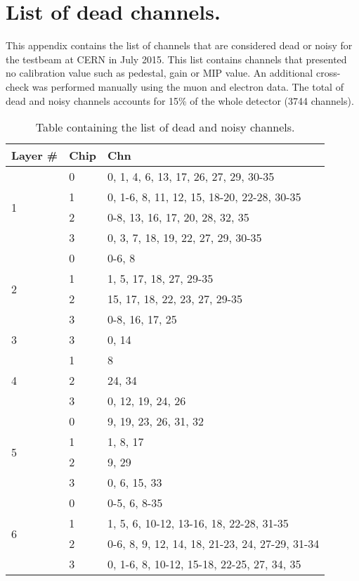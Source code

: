\chapter{List of dead channels.}
\label{appendix:deadChn}

This appendix contains the list of channels that are considered dead or noisy for the testbeam at CERN in July 2015. This list contains channels that presented no calibration value such as pedestal, gain or MIP value. An additional cross-check was performed manually \cite{AmbraEnergy} using the muon and electron data. The total of dead and noisy channels accounts for 15\% of the whole detector (3744 channels).

\begin{table}[htb!]
  \centering
  \caption{Table containing the list of dead and noisy channels.}
  \label{table:DeadNoisyList}
  \begin{tabular}{@{} lll @{}}
    \toprule
    Layer \# & Chip & Chn\\
    \midrule
    \multirow{4}{*}{1} & 0 & 0, 1, 4, 6, 13, 17, 26, 27, 29, 30-35\\
    & 1 & 0, 1-6, 8, 11, 12, 15, 18-20, 22-28, 30-35\\
    & 2 & 0-8, 13, 16, 17, 20, 28, 32, 35\\
    & 3 & 0, 3, 7, 18, 19, 22, 27, 29, 30-35\\
    \multirow{4}{*}{2} & 0 & 0-6, 8\\
    & 1 & 1, 5, 17, 18, 27, 29-35\\
    & 2 & 15, 17, 18, 22, 23, 27, 29-35\\
    & 3 & 0-8, 16, 17, 25\\
    \multirow{1}{*}{3} & 3 & 0, 14\\
    \multirow{3}{*}{4} & 1 & 8\\
    & 2 & 24, 34\\
    & 3 & 0, 12, 19, 24, 26\\
    \multirow{4}{*}{5} & 0 & 9, 19, 23, 26, 31, 32\\
    & 1 & 1, 8, 17\\
    & 2 & 9, 29\\
    & 3 & 0, 6, 15, 33\\
    \multirow{4}{*}{6} & 0 & 0-5, 6, 8-35\\
    & 1 & 1, 5, 6, 10-12, 13-16, 18, 22-28, 31-35\\
    & 2 & 0-6, 8, 9, 12, 14, 18, 21-23, 24, 27-29, 31-34\\
    & 3 & 0, 1-6, 8, 10-12, 15-18, 22-25, 27, 34, 35\\

\end{tabular}
\end{table}
